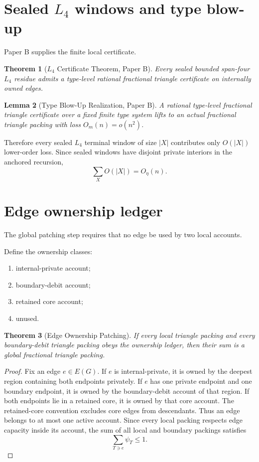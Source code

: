 \documentclass[11pt]{article}
\newtheorem{theorem}{Theorem}[section]
\newtheorem{lemma}[theorem]{Lemma}
\theoremstyle{definition}
\begin{document}
\section{Sealed \(L_4\) windows and type blow-up}

Paper B supplies the finite local certificate.

\begin{theorem}[\(L_4\) Certificate Theorem, Paper B]\label{thm:import-l4}
Every sealed bounded span-four \(L_4\) residue admits a type-level rational fractional triangle certificate on internally owned edges.
\end{theorem}

\begin{lemma}[Type Blow-Up Realization, Paper B]\label{lem:import-blowup}
A rational type-level fractional triangle certificate over a fixed finite type system lifts to an actual fractional triangle packing with loss \(O_m(n)=o(n^2)\).
\end{lemma}

Therefore every sealed \(L_4\) terminal window of size \(|X|\) contributes only \(O(|X|)\) lower-order loss. Since sealed windows have disjoint private interiors in the anchored recursion,
\[
    \sum_XO(|X|)=O_\eta(n).
\]

\section{Edge ownership ledger}

The global patching step requires that no edge be used by two local accounts.

Define the ownership classes:
\begin{enumerate}[label=(\roman*)]
    \item internal-private account;
    \item boundary-debit account;
    \item retained core account;
    \item unused.
\end{enumerate}

\begin{theorem}[Edge Ownership Patching]\label{thm:ownership}
If every local triangle packing and every boundary-debit triangle packing obeys the ownership ledger, then their sum is a global fractional triangle packing.
\end{theorem}

\begin{proof}
Fix an edge \(e\in E(G)\). If \(e\) is internal-private, it is owned by the deepest region containing both endpoints privately. If \(e\) has one private endpoint and one boundary endpoint, it is owned by the boundary-debit account of that region. If both endpoints lie in a retained core, it is owned by that core account. The retained-core convention excludes core edges from descendants. Thus an edge belongs to at most one active account. Since every local packing respects edge capacity inside its account, the sum of all local and boundary packings satisfies
\[
    \sum_{T\ni e}\psi_T\le1.
\]
\end{proof}
\end{document}
